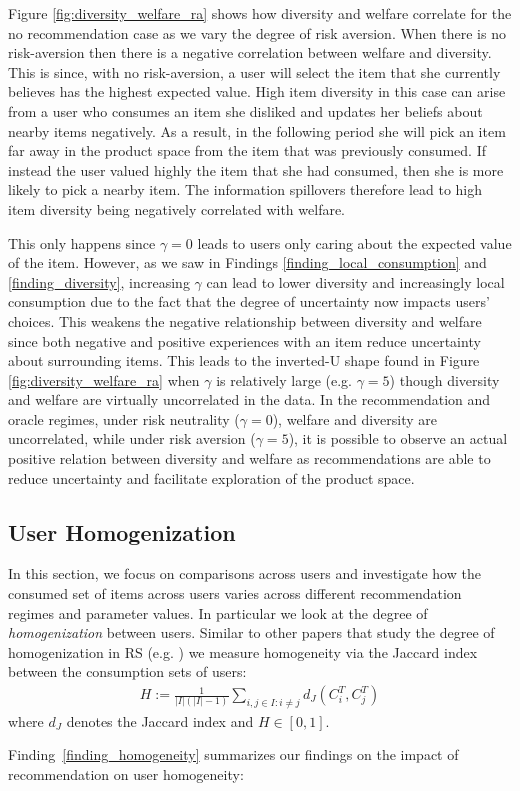 \documentclass[manuscript, nonacm]{acmart}
\begin{document}
Figure \ref{fig:diversity_welfare_ra} shows how diversity and welfare correlate for the no recommendation case as we vary the degree of risk aversion. When there is no risk-aversion then there is a negative correlation between welfare and diversity. This is since, with no risk-aversion, a user will select the item that she currently believes has the highest expected value. High item diversity in this case can arise from a user who consumes an item she disliked and updates her beliefs about nearby items negatively. As a result, in the following period she will pick an item far away in the product space from the item that was previously consumed. If instead the user valued highly the item that she had consumed, then she is more likely to pick a nearby item. The information spillovers therefore lead to high item diversity being negatively correlated with welfare.
\par
This only happens since $\gamma = 0$ leads to users only caring about the expected value of the item. However, as we saw in Findings \ref{finding_local_consumption} and \ref{finding_diversity}, increasing $\gamma$ can lead to lower diversity and increasingly local consumption due to the fact that the degree of uncertainty now impacts users' choices. This weakens the negative relationship between diversity and welfare since both negative and positive experiences with an item reduce uncertainty about surrounding items. This leads to the inverted-U shape found in Figure \ref{fig:diversity_welfare_ra} when $\gamma$ is relatively large (e.g. $\gamma = 5$) though diversity and welfare are virtually uncorrelated in the data. In the recommendation and oracle regimes, under risk neutrality ($\gamma=0$), welfare and diversity are uncorrelated, while under risk aversion ($\gamma=5$), it is possible to observe an actual positive relation between diversity and welfare as recommendations are able to reduce uncertainty and facilitate exploration of the product space.

\subsection{User Homogenization}


In this section, we focus on comparisons across users and investigate how the consumed set of items across users varies across different recommendation regimes and parameter values. In particular we look at the degree of \textit{homogenization} between users. Similar to other papers that study the degree of homogenization in RS (e.g. \cite{chaney2018algorithmic}) we measure homogeneity via the Jaccard index between the consumption sets of users:
\begin{align*}
H:=\frac{1}{|I|(|I|-1)}\sum_{i,j \in I: i \ne j}d_J(C_i^T,C_j^T)
\end{align*}
where $d_J$ denotes the Jaccard index and $H \in [0,1]$.
\par
\noindent Finding~\ref{finding_homogeneity} summarizes our findings on the impact of recommendation on user homogeneity:
\end{document}
